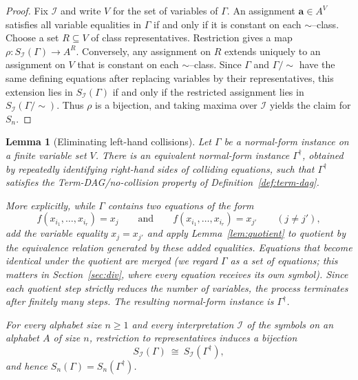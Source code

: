 \documentclass[11pt]{article}
\theoremstyle{plain}
\newtheorem{lemma}[theorem]{Lemma}
\theoremstyle{definition}
\theoremstyle{definition}
\theoremstyle{remark}
\newcommand{\A}{A}
\newcommand{\Sn}{S_n}
\begin{document}
\begin{proof}
Fix $\mathcal I$ and write $V$ for the set of variables of $\Gamma$.
An assignment $\mathbf a\in \A^{V}$ satisfies all variable equalities in $\Gamma$ if and only if it is
constant on each $\sim$--class.
Choose a set $R\subseteq V$ of class representatives.
Restriction gives a map
$\rho:S_{\mathcal I}(\Gamma)\to \A^R$.
Conversely, any assignment on $R$ extends uniquely to an assignment on $V$ that is constant on each
$\sim$--class.
Since $\Gamma$ and $\Gamma/\!\sim$ have the same defining equations after replacing variables by their
representatives, this extension lies in $S_{\mathcal I}(\Gamma)$ if and only if the restricted assignment
lies in $S_{\mathcal I}(\Gamma/\!\sim)$.
Thus $\rho$ is a bijection, and taking maxima over $\mathcal I$ yields the claim for $\Sn$.
\end{proof}

\begin{lemma}[Eliminating left-hand collisions]
\label{lem:collision-quotient}
Let $\Gamma$ be a normal-form instance on a finite variable set $V$.
There is an equivalent normal-form instance $\Gamma^{\dagger}$, obtained by repeatedly
identifying right-hand sides of colliding equations, such that $\Gamma^{\dagger}$ satisfies the
Term-DAG/no-collision property of Definition~\ref{def:term-dag}.

More explicitly, while $\Gamma$ contains two equations of the form
\[
  f(x_{i_1},\dots,x_{i_r})=x_j\qquad\text{and}\qquad f(x_{i_1},\dots,x_{i_r})=x_{j'}\qquad (j\neq j'),
\]
add the variable equality $x_j=x_{j'}$ and apply Lemma~\ref{lem:quotient} to quotient by the
equivalence relation generated by these added equalities.
Equations that become identical under the quotient are merged (we regard $\Gamma$ as a set of
equations; this matters in Section~\ref{sec:div}, where every equation receives its own symbol).
Since each quotient step strictly reduces the number of variables, the process terminates after finitely many steps.
The resulting normal-form instance is $\Gamma^{\dagger}$.

For every alphabet size $n\ge 1$ and every interpretation $\mathcal I$ of the symbols on an alphabet $\A$ of size $n$,
restriction to representatives induces a bijection
\[
  S_{\mathcal I}(\Gamma)\ \cong\ S_{\mathcal I}(\Gamma^{\dagger}),
\]
and hence $\Sn(\Gamma)=\Sn(\Gamma^{\dagger})$.
\end{lemma}
\end{document}
